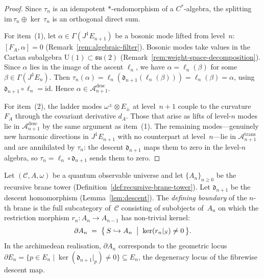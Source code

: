 \begin{proof}
Since $\tau_n$ is an idempotent $*$-endomorphism of a $C^*$-algebra, the
splitting $\mathrm{im}\,\tau_n \oplus \ker\,\tau_n$ is an orthogonal direct
sum.

For item~(1), let $\alpha \in \Gamma(J^1 E_{n+1})$ be a bosonic mode lifted
from level~$n$: $[F_A, \alpha] = 0$ (Remark~\ref{rem:algebraic-filter}).
Bosonic modes take values in the Cartan subalgebra
$\mathrm{U}(1) \subset \mathfrak{su}(2)$
(Remark~\ref{rem:weight-space-decomposition}).  Since $\alpha$ lies in the
image of the ascent $\ell_n$, we have $\alpha = \ell_n(\beta)$ for some
$\beta \in \Gamma(J^1 E_n)$.  Then
$\tau_n(\alpha) = \ell_n(\mathfrak{d}_{n+1}(\ell_n(\beta)))
= \ell_n(\beta) = \alpha$,
using $\mathfrak{d}_{n+1} \circ \ell_n = \mathrm{id}$.  Hence
$\alpha \in \mathcal{A}_{n+1}^{\mathrm{desc}}$.

For item~(2), the ladder modes $\omega^\pm \otimes E_\pm$ at level~$n{+}1$
couple to the curvature $F_A$ through the covariant derivative $d_A$.  Those
that arise as lifts of level-$n$ modes lie in
$\mathcal{A}_{n+1}^{\mathrm{desc}}$ by the same argument as item~(1).  The
remaining modes---genuinely new harmonic directions in $J^1 E_{n+1}$ with no
counterpart at level~$n$---lie in $\mathcal{A}_{n+1}^{\mathrm{trans}}$ and
are annihilated by $\tau_n$: the descent $\mathfrak{d}_{n+1}$ maps them to
zero in the level-$n$ algebra, so $\tau_n = \ell_n \circ \mathfrak{d}_{n+1}$
sends them to zero.
\end{proof}


\begin{definition}
\label{def:brane-boundary}
Let $(\mathcal{C}, A, \omega)$ be a quantum observable universe and let
$\{A_n\}_{n \geq 0}$ be the recursive brane tower
(Definition~\ref{def:recursive-brane-tower}).  Let $\mathfrak{d}_{n+1}$ be
the descent homomorphism (Lemma~\ref{lem:descent}).  The \emph{defining
boundary} of the $n$-th brane is the full subcategory of~$\mathcal{C}$
consisting of subobjects of~$A_n$ on which the restriction morphism
$r_n \colon A_n \to A_{n-1}$ has non-trivial kernel:
\[
  \partial A_n
  \;=\;
  \bigl\{\, S \hookrightarrow A_n \;\bigm|\;
    \ker(r_n|_S) \neq 0 \,\bigr\}.
\]
In the archimedean realisation,
$\partial A_n$ corresponds to the geometric locus
$\partial E_n = \{p \in E_n \mid
\ker(\mathfrak{d}_{n+1}|_p) \neq 0\} \subseteq E_n$,
the degeneracy locus of the fibrewise descent map.
\end{definition}

